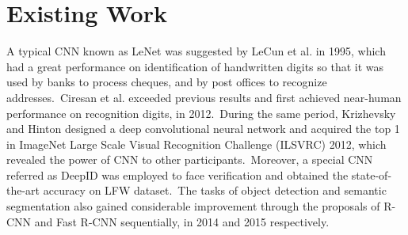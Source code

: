 \section{Existing Work}
A typical CNN known as LeNet was suggested by LeCun et al. \cite{lecun1995comparison}\cite{lecun1998gradient} in 1995, which had a great performance on identification of handwritten digits so that it was used by banks to process cheques, and by post offices to recognize addresses.~Ciresan et al.\cite{ciresan2012multi} exceeded previous results and first achieved near-human performance on recognition digits, in 2012.~During the same period, Krizhevsky and Hinton \cite{krizhevsky2012imagenet} designed a deep convolutional neural network and acquired the top 1 in ImageNet Large Scale Visual Recognition Challenge (ILSVRC) 2012, which revealed the power of CNN to other participants.~Moreover, a special CNN referred as DeepID \cite{Sun2014CVPR} was employed to face verification and obtained the state-of-the-art accuracy on LFW dataset.~The tasks of object detection and semantic segmentation also gained considerable improvement through the proposals of R-CNN \cite{girshick2014rich} and Fast R-CNN \cite{girshick2015fast} sequentially, in 2014 and 2015 respectively.